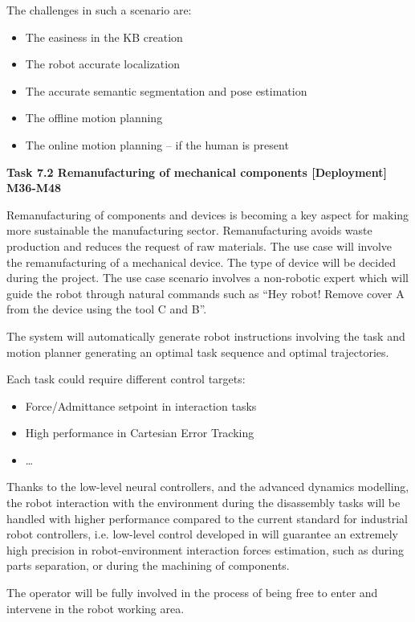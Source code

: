 \begin{planactivitybody}
The challenges in such a scenario are:

\begin{itemize}
\item
  The easiness in the KB creation
\item
  The robot accurate localization
\item
  The accurate semantic segmentation and pose estimation
\item
  The offline motion planning
\item
  The online motion planning -- if the human is present
\end{itemize}

\plantaskskip
\textbf{Task 7.2 Remanufacturing of mechanical components
{[}Deployment{]} M36-M48}

Remanufacturing of components and devices is becoming a key aspect for
making more sustainable the manufacturing sector. Remanufacturing avoids
waste production and reduces the request of raw materials. The use case
will involve the remanufacturing of a mechanical device. The type of
device will be decided during the project. The use case scenario
involves a non-robotic expert which will guide the robot through natural
commands such as ``Hey robot! Remove cover A from the device using the
tool C and B''.

The system will automatically generate robot instructions involving the
task and motion planner generating an optimal task sequence and optimal
trajectories.

Each task could require different control targets:

\begin{itemize}
\item
  Force/Admittance setpoint in interaction tasks
\item
  High performance in Cartesian Error Tracking
\item
  \ldots{}
\end{itemize}

Thanks to the low-level neural controllers, and the advanced dynamics
modelling, the robot interaction with the environment during the
disassembly tasks will be handled with higher performance compared to
the current standard for industrial robot controllers, i.e. low-level
control developed in  will guarantee an extremely high
precision in robot-environment interaction forces estimation, such as
during parts separation, or during the machining of components.

The operator will be fully involved in the process of being free to
enter and intervene in the robot working area.


\end{planactivitybody}
